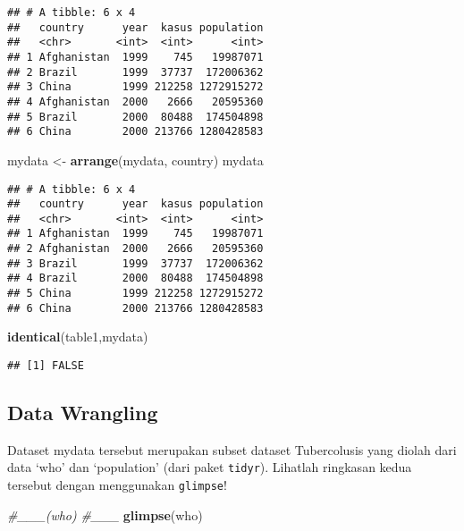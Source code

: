 \documentclass[]{article}
\newenvironment{Shaded}{\begin{snugshade}}{\end{snugshade}}
\newcommand{\CommentTok}[1]{\textcolor[rgb]{0.56,0.35,0.01}{\textit{#1}}}
\newcommand{\KeywordTok}[1]{\textcolor[rgb]{0.13,0.29,0.53}{\textbf{#1}}}
\newcommand{\NormalTok}[1]{#1}
\newcommand{\StringTok}[1]{\textcolor[rgb]{0.31,0.60,0.02}{#1}}
\begin{document}
\begin{verbatim}
## # A tibble: 6 x 4
##   country      year  kasus population
##   <chr>       <int>  <int>      <int>
## 1 Afghanistan  1999    745   19987071
## 2 Brazil       1999  37737  172006362
## 3 China        1999 212258 1272915272
## 4 Afghanistan  2000   2666   20595360
## 5 Brazil       2000  80488  174504898
## 6 China        2000 213766 1280428583
\end{verbatim}

\begin{Shaded}
\begin{Highlighting}[]
\NormalTok{mydata <-}\StringTok{ }\KeywordTok{arrange}\NormalTok{(mydata, country)}
\NormalTok{mydata}
\end{Highlighting}
\end{Shaded}

\begin{verbatim}
## # A tibble: 6 x 4
##   country      year  kasus population
##   <chr>       <int>  <int>      <int>
## 1 Afghanistan  1999    745   19987071
## 2 Afghanistan  2000   2666   20595360
## 3 Brazil       1999  37737  172006362
## 4 Brazil       2000  80488  174504898
## 5 China        1999 212258 1272915272
## 6 China        2000 213766 1280428583
\end{verbatim}

\begin{Shaded}
\begin{Highlighting}[]
\KeywordTok{identical}\NormalTok{(table1,mydata)}
\end{Highlighting}
\end{Shaded}

\begin{verbatim}
## [1] FALSE
\end{verbatim}

\hypertarget{data-wrangling}{%
\subsection{Data Wrangling}\label{data-wrangling}}

Dataset mydata tersebut merupakan subset dataset Tubercolusis yang
diolah dari data `who' dan `population' (dari paket \texttt{tidyr}).
Lihatlah ringkasan kedua tersebut dengan menggunakan \texttt{glimpse}!

\begin{Shaded}
\begin{Highlighting}[]
\CommentTok{#___(who)}
\CommentTok{#___}
\KeywordTok{glimpse}\NormalTok{(who)}
\end{Highlighting}
\end{Shaded}
\end{document}
